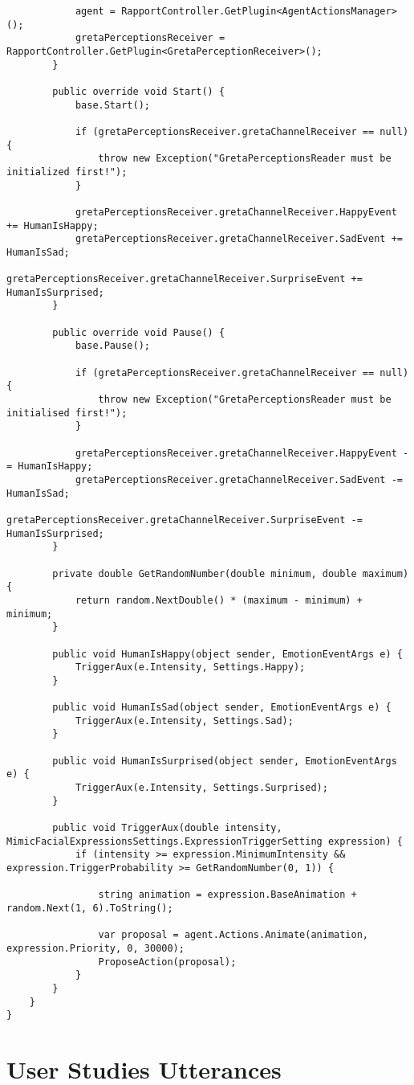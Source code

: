 \begin{lstlisting}
            agent = RapportController.GetPlugin<AgentActionsManager>();
            gretaPerceptionsReceiver = RapportController.GetPlugin<GretaPerceptionReceiver>();
        }

        public override void Start() {
            base.Start();

            if (gretaPerceptionsReceiver.gretaChannelReceiver == null) {
                throw new Exception("GretaPerceptionsReader must be initialized first!");
            }

            gretaPerceptionsReceiver.gretaChannelReceiver.HappyEvent += HumanIsHappy;
            gretaPerceptionsReceiver.gretaChannelReceiver.SadEvent += HumanIsSad;
            gretaPerceptionsReceiver.gretaChannelReceiver.SurpriseEvent += HumanIsSurprised;
        }

        public override void Pause() {
            base.Pause();

            if (gretaPerceptionsReceiver.gretaChannelReceiver == null) {
                throw new Exception("GretaPerceptionsReader must be initialised first!");
            }

            gretaPerceptionsReceiver.gretaChannelReceiver.HappyEvent -= HumanIsHappy;
            gretaPerceptionsReceiver.gretaChannelReceiver.SadEvent -= HumanIsSad;
            gretaPerceptionsReceiver.gretaChannelReceiver.SurpriseEvent -= HumanIsSurprised;
        }

        private double GetRandomNumber(double minimum, double maximum) {
            return random.NextDouble() * (maximum - minimum) + minimum;
        }

        public void HumanIsHappy(object sender, EmotionEventArgs e) {
            TriggerAux(e.Intensity, Settings.Happy);
        }

        public void HumanIsSad(object sender, EmotionEventArgs e) {
            TriggerAux(e.Intensity, Settings.Sad);
        }

        public void HumanIsSurprised(object sender, EmotionEventArgs e) {
            TriggerAux(e.Intensity, Settings.Surprised);
        }

        public void TriggerAux(double intensity, MimicFacialExpressionsSettings.ExpressionTriggerSetting expression) {
            if (intensity >= expression.MinimumIntensity && expression.TriggerProbability >= GetRandomNumber(0, 1)) {

                string animation = expression.BaseAnimation + random.Next(1, 6).ToString();

                var proposal = agent.Actions.Animate(animation, expression.Priority, 0, 30000);
                ProposeAction(proposal);
            }
        }
    }
}
\end{lstlisting}


\chapter{User Studies Utterances}
\label{chapter:appendixC}



